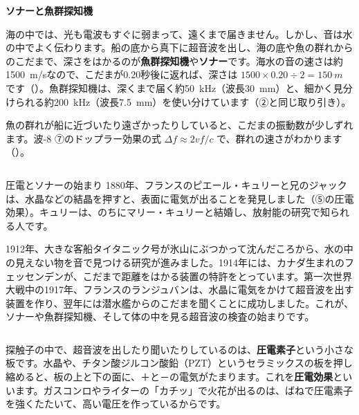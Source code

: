 \noindent\textbf{ソナーと魚群探知機}\par\nobreak
海の中では、光も電波もすぐに弱まって、遠くまで届きません。しかし、音は水の中でよく伝わります。船の底から真下に超音波を出し、海の底や魚の群れからのこだまで、深さをはかるのが\textbf{魚群探知機}や\textbf{ソナー}です。海水の音の速さは約\qty{1500}{m/s}なので、こだまが0.20秒後に返れば、深さは $1500\times0.20\div2=\qty{150}{m}$ です（）。魚群探知機は、深くまで届く約\qty{50}{kHz}（波長\qty{30}{mm}）と、細かく見分けられる約\qty{200}{kHz}（波長\qty{7.5}{mm}）を使い分けています（②と同じ取り引き）。

魚の群れが船に近づいたり遠ざかったりしていると、こだまの振動数が少しずれます。波-8 ⑦のドップラー効果の式 $\Delta f\approx2vf/c$ で、群れの速さがわかります（）。

\begin{column}{圧電とソナーの始まり}
1880年、フランスのピエール・キュリーと兄のジャックは、水晶などの結晶を押すと、表面に電気が出ることを発見しました（⑤の圧電効果）。キュリーは、のちにマリー・キュリーと結婚し、放射能の研究で知られる人です。

1912年、大きな客船タイタニック号が氷山にぶつかって沈んだころから、水の中の見えない物を音で見つける研究が進みました。1914年には、カナダ生まれのフェッセンデンが、こだまで距離をはかる装置の特許をとっています。第一次世界大戦中の1917年、フランスのランジュバンは、水晶に電気をかけて超音波を出す装置を作り、翌年には潜水艦からのこだまを聞くことに成功しました。これが、ソナーや魚群探知機、そして体の中を見る超音波の検査の始まりです。
\end{column}


\leavevmode\label{ph:波-10:sec5}探触子の中で、超音波を出したり聞いたりしているのは、\textbf{圧電素子}という小さな板です。水晶や、チタン酸ジルコン酸鉛（PZT）というセラミックスの板を押し縮めると、板の上と下の面に、＋と－の電気がたまります。これを\textbf{圧電効果}といいます。ガスコンロやライターの「カチッ」で火花が出るのは、ばねで圧電素子を強くたたいて、高い電圧を作っているからです。

